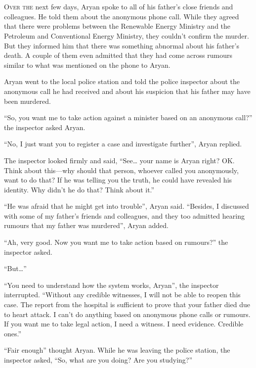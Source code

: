 \chapter{}

\lettrine{O}{ver the} next few days, Aryan spoke to all of his father's close friends and
colleagues. He told them about the anonymous phone call. While they agreed that
there were problems between the Renewable Energy Ministry and the
Petroleum and Conventional Energy Ministry, they couldn't confirm the murder. But
they informed him that there was something abnormal about his father's death. A
couple of them even admitted that they had come across rumours similar to what
was mentioned on the phone to Aryan.

Aryan went to the local police station and told the police inspector about the
anonymous call he had received and about his suspicion that his father may have been
murdered.

“So, you want me to take action against a minister based on an anonymous call?”
the inspector asked Aryan.

“No, I just want you to register a case and investigate further”, Aryan replied.

The inspector looked firmly and said, “See… your name is Aryan right? OK.
Think about this—why should that person, whoever called you anonymously, want
to do that? If he was telling you the truth, he could have revealed his
identity. Why didn't he do that? Think about it.”

“He was afraid that he might get into trouble”, Aryan said. “Besides, I
discussed with some of my father's friends and colleagues, and they too admitted
hearing rumours that my father was murdered”, Aryan added.

“Ah, very good. Now you want me to take action based on rumours?” the inspector
asked.

“But…”

“You need to understand how the system works, Aryan”, the inspector interrupted.
“Without any credible witnesses, I will not be able to reopen this case. The
report from the hospital is sufficient to prove that your father died due to
heart attack. I can't do anything based on anonymous phone calls or rumours. If
you want me to take legal action, I need a witness. I need evidence. Credible
ones.”

“Fair enough” thought Aryan. While he was leaving the police station, the
inspector asked, “So, what are you doing? Are you studying?”

